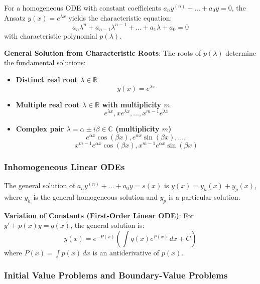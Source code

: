 \begin{lemma}
    For a homogeneous ODE with constant coefficients $a_n y^{(n)} + \dots + a_0 y = 0$, the Ansatz $y(x) = e^{\lambda x}$ yields the characteristic equation:
    $$a_n \lambda^n + a_{n-1} \lambda^{n-1} + \dots + a_1 \lambda + a_0 = 0$$
    with characteristic polynomial $p(\lambda)$.
\end{lemma}

\begin{theorem}
    \textbf{General Solution from Characteristic Roots}: The roots of $p(\lambda)$ determine the fundamental solutions:
    \begin{itemize}
        \item \textbf{Distinct real root $\lambda \in \mathbb{R}$}
        $$y(x) = e^{\lambda x}$$
        \item \textbf{Multiple real root $\lambda \in \mathbb{R}$ with multiplicity $m$}
        $$e^{\lambda x}, x e^{\lambda x}, \dots, x^{m-1} e^{\lambda x}$$
        \item \textbf{Complex pair $\lambda = \alpha \pm i\beta \in \mathbb{C}$ (multiplicity $m$)}
        $$e^{\alpha x}\cos(\beta x), e^{\alpha x}\sin(\beta x), \dots,$$
        $$x^{m-1}e^{\alpha x}\cos(\beta x), x^{m-1}e^{\alpha x}\sin(\beta x)$$
    \end{itemize}
\end{theorem}

\subsubsection{Inhomogeneous Linear ODEs}

\begin{lemma}
    The general solution of $a_n y^{(n)} + \dots + a_0 y = s(x)$ is $y(x) = y_h(x) + y_p(x)$, where $y_h$ is the general homogeneous solution and $y_p$ is a particular solution.
\end{lemma}

\begin{theorem}
    \textbf{Variation of Constants (First-Order Linear ODE)}: For $y' + p(x)y = q(x)$, the general solution is:
    $$y(x) = e^{-P(x)} \left( \int q(x) e^{P(x)} \, dx + C \right)$$
    where $P(x) = \int p(x) \, dx$ is an antiderivative of $p(x)$.
\end{theorem}

\subsubsection{Initial Value Problems and Boundary-Value Problems}

